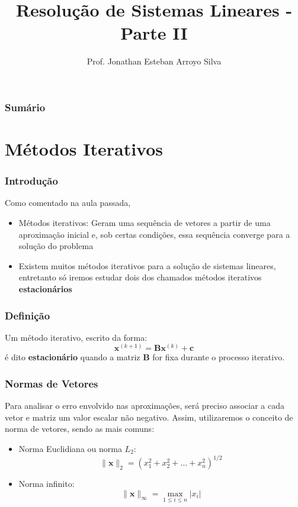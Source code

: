 \documentclass{beamer}
\title{Resolução de Sistemas Lineares - Parte II}
\author
{
	Prof. Jonathan Esteban Arroyo Silva	
}
\institute
{
	Departamento de Ciência da Computação\\
	Universidade Federal de São João del-Rei\\
	\texttt{silva.jea@ufsj.edu.br}
}
\date{}
\theoremstyle{mystyle}
\begin{document}
	
\begin{frame}[plain]
    \maketitle
\end{frame}

\begin{frame}[plain]
	\frametitle{Sumário}
	\tableofcontents
\end{frame}

\section{Métodos Iterativos}

\begin{frame}
	\frametitle{Introdução}
	Como comentado na aula passada,
	\begin{itemize}
		\item Métodos iterativos: Geram uma sequência de vetores a partir de uma aproximação inicial e, sob certas condições, essa sequência converge para a solução do problema
		\item Existem muitos métodos iterativos para a solução de sistemas lineares, entretanto só iremos estudar dois dos chamados métodos iterativos \textbf{estacionários}
	\end{itemize}
\end{frame}

\begin{frame}
	\frametitle{Definição}
	Um método iterativo, escrito da forma:
	\begin{equation*}
		\mathbf{x}^{(k+1)} = \mathbf{B}\mathbf{x}^{(k)} + \mathbf{c}
	\end{equation*}
	é dito \textbf{estacionário} quando a matriz \textbf{B} for fixa durante o processo iterativo.
\end{frame}

\begin{frame}
	\frametitle{Normas de Vetores}
	Para analisar o erro envolvido nas aproximações, será preciso associar a cada vetor e matriz um valor escalar não negativo.
	Assim, utilizaremos o conceito de norma de vetores, sendo as mais comuns:
	\begin{itemize}
		\item Norma Euclidiana ou norma $ L_{2} $:
		\begin{equation*}
			\| \mathbf{x} \|_{2} = (x_{1}^{2} + x_{2}^{2} +\ldots+ x_{n}^{2} )^{1/2}
		\end{equation*}
		\item Norma infinito:
		\begin{equation*}
			\| \mathbf{x} \|_{\infty} = \max_{1\leq i \leq n} |x_{i}|
		\end{equation*}
	\end{itemize}
\end{frame}
\end{document}
